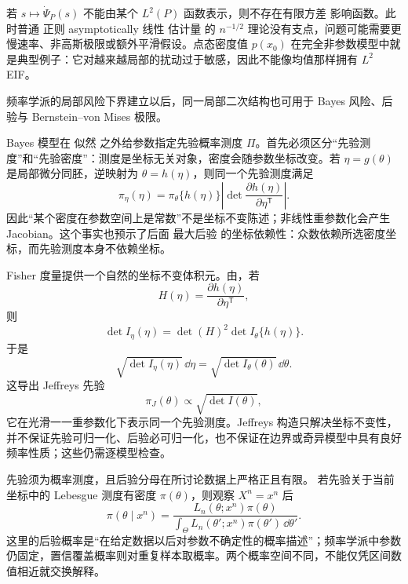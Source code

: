 \begin{note}
若 $s\mapsto\dot\Psi_P(s)$ 不能由某个 $L^2(P)$ 函数表示，则不存在有限方差 影响函数。此时普通 正则 asymptotically 线性 估计量 的 $n^{-1/2}$ 理论没有支点，问题可能需要更慢速率、非高斯极限或额外平滑假设。点态密度值 $p(x_0)$ 在完全非参数模型中就是典型例子：它对越来越局部的扰动过于敏感，因此不能像均值那样拥有 $L^2$ EIF。
\end{note}

频率学派的局部风险下界建立以后，同一局部二次结构也可用于 Bayes 风险、后验与 Bernstein--von Mises 极限。

\begin{definition}[先验测度与坐标密度]
Bayes 模型在 似然 之外给参数指定先验概率测度 $\Pi$。首先必须区分“先验测度”和“先验密度”：测度是坐标无关对象，密度会随参数坐标改变。若 $\eta=g(\theta)$ 是局部微分同胚，逆映射为 $\theta=h(\eta)$，则同一个先验测度满足
\begin{equation*}\pi_\eta(\eta)
 =\pi_\theta\{h(\eta)\}
 \left|\det\frac{\partial h(\eta)}{\partial\eta^{\mathsf T}}\right|.
\end{equation*}
因此“某个密度在参数空间上是常数”不是坐标不变陈述；非线性重参数化会产生 Jacobian。这个事实也预示了后面 最大后验 的坐标依赖性：众数依赖所选密度坐标，而先验测度本身不依赖坐标。
\end{definition}

\begin{proposition}
Fisher 度量提供一个自然的坐标不变体积元。由，若
\[
 H(\eta)=\frac{\partial h(\eta)}{\partial\eta^{\mathsf T}},
\]
则
\[
 \det I_\eta(\eta)
 =\det(H)^2\det I_\theta\{h(\eta)\}.
\]
于是
\begin{equation*}\sqrt{\det I_\eta(\eta)}\,\dd\eta
 =\sqrt{\det I_\theta(\theta)}\,\dd\theta.
\end{equation*}
这导出 Jeffreys 先验
\begin{equation*}\pi_J(\theta)\propto\sqrt{\det I(\theta)},
\end{equation*}
它在光滑一一重参数化下表示同一个先验测度。Jeffreys 构造只解决坐标不变性，并不保证先验可归一化、后验必可归一化，也不保证在边界或奇异模型中具有良好频率性质；这些仍需逐模型检查。
\end{proposition}

\begin{definition}[后验概率]
先验须为概率测度，且后验分母在所讨论数据上严格正且有限。
若先验关于当前坐标中的 Lebesgue 测度有密度 $\pi(\theta)$，则观察 $X^n=x^n$ 后
\begin{equation}\label{eq:math-stat-bayes-posterior}
 \pi(\theta\mid x^n)
 =\frac{L_n(\theta;x^n)\pi(\theta)}
 {\int_\Theta L_n(\theta';x^n)\pi(\theta')\,\dd\theta'}.
\end{equation}
这里的后验概率是“在给定数据以后对参数不确定性的概率描述”；频率学派中参数仍固定，置信覆盖概率则对重复样本取概率。两个概率空间不同，不能仅凭区间数值相近就交换解释。
\end{definition}

